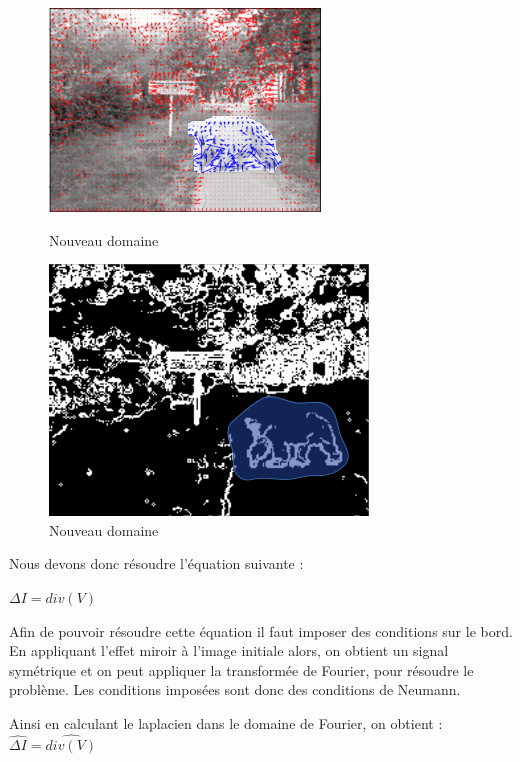       \begin{figure}[!h]
        \begin{minipage}{0.5\textwidth}
     \centering
      \includegraphics[scale=0.5]{Images/V.png}
      \caption{Nouveau domaine}
      \end{minipage}\hfill
              \begin{minipage}{0.5\textwidth}
     \centering
      \includegraphics[scale=0.4]{Images/gradient.png}
      \caption{Nouveau domaine}
      \end{minipage}\hfill
      \end{figure}
Nous devons donc résoudre l'équation suivante : 
\begin{center}
$ \Delta I = div(V)$
\end{center}
Afin de pouvoir résoudre cette équation il faut imposer des conditions sur le bord. En appliquant l'effet miroir à l'image initiale alors, on obtient un signal symétrique  et on peut appliquer la transformée de Fourier, pour résoudre le problème.  Les conditions imposées sont donc des conditions de Neumann.

Ainsi en calculant le laplacien dans le domaine de Fourier, on obtient  : $\widehat{\Delta I} = \widehat{div(V)}$

